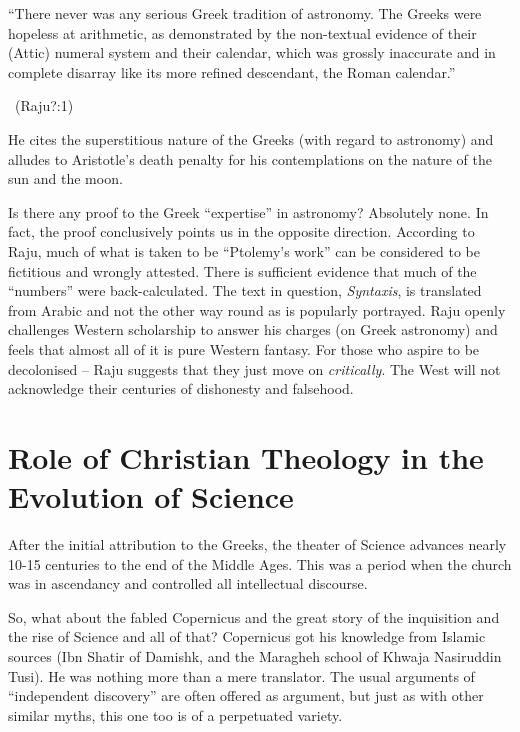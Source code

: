 \begin{myquote}
“There never was any serious Greek tradition of astronomy. The Greeks were hopeless at arithmetic, as demonstrated by the non-textual evidence of their (Attic) numeral system and their calendar, which was grossly inaccurate and in complete disarray like its more refined descendant, the Roman calendar.” 

~\hfill (Raju?:1)
\end{myquote}

He cites the superstitious nature of the Greeks (with regard to astronomy) and alludes to Aristotle’s death penalty for his contemplations on the nature of the sun and the moon.

Is there any proof to the Greek “expertise” in astronomy? Absolutely none. In fact, the proof conclusively points us in the opposite direction. According to Raju, much of what is taken to be “Ptolemy’s work” can be considered to be fictitious and wrongly attested. There is sufficient evidence that much of the “numbers” were back-calculated. The text in question, \textit{Syntaxis}, is translated from Arabic and not the other way round as is popularly portrayed. Raju openly challenges Western scholarship to answer his charges (on Greek astronomy) and feels that almost all of it is pure Western fantasy. For those who aspire to be decolonised – Raju suggests that they just move on \textit{critically}. The West will not acknowledge their centuries of dishonesty and falsehood.


\section*{Role of Christian Theology in the Evolution of Science}

After the initial attribution to the Greeks, the theater of Science advances nearly 10-15 centuries to the end of the Middle Ages. This was a period when the church was in ascendancy and controlled all intellectual discourse.

So, what about the fabled Copernicus and the great story of the inquisition and the rise of Science and all of that? Copernicus got his knowledge from Islamic sources (Ibn Shatir of Damishk, and the Maragheh school of Khwaja Nasiruddin Tusi). He was nothing more than a mere translator. The usual arguments of “independent discovery” are often offered as argument, but just as with other similar myths, this one too is of a perpetuated variety.

